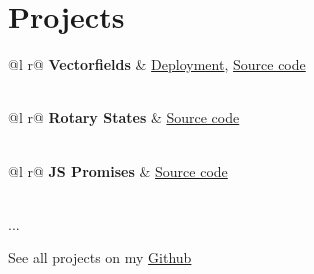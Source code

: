 \documentclass[a4paper,12pt]{article}
\begin{document}
\section{Projects}

\begin{tabularx}{\linewidth}{ @{}l r@{} }
    \textbf{Vectorfields} & \hfill \href{https://shorturl.at/zAC56}{Deployment},  \href{https://github.com/DimaAmega/vectorfields}{Source code} \\[3.75pt]
      \\
\end{tabularx}

\begin{tabularx}{\linewidth}{ @{}l r@{} }
    \textbf{Rotary States} & \hfill \href{https://github.com/unn-dynamic-systems/rotary_states}{Source code} \\[3.75pt]
     \\
\end{tabularx}

\begin{tabularx}{\linewidth}{ @{}l r@{} }
    \textbf{JS Promises} & \hfill \href{https://github.com/DimaAmega/js-promise-implementation}{Source code} \\[3.75pt]
     \\
\end{tabularx}

...

See all projects on my \href{https://github.com/dimaamega}{Github}

\end{document}
